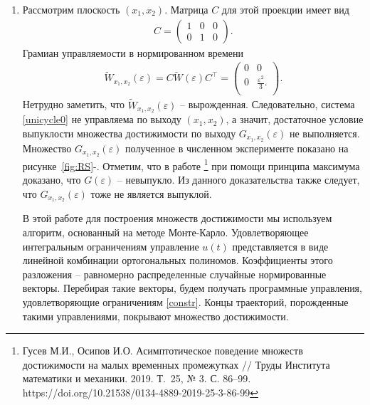 \documentclass[../main.tex]{subfiles}
\begin{document}
	\begin{enumerate}
		\item Рассмотрим плоскость $ (x_1, x_2) $. Матрица $ C $ для этой проекции имеет вид
		\begin{gather*}
			C = \begin{pmatrix}
				1 & 0 & 0 \\
				0 & 1 & 0
			\end{pmatrix}.
		\end{gather*}
		Грамиан управляемости в нормированном времени
		\begin{gather*}
			\widetilde{W}_{x_1,x_2}(\varepsilon) =  C \widetilde{W} (\varepsilon) C^{\top}  =\begin{pmatrix}
				0 & 0 \\
				0 & \frac{\varepsilon^2}{3}. \\
			\end{pmatrix}.
		\end{gather*}
		Нетрудно заметить, что $ \widetilde{W}_{x_1,x_2}(\varepsilon) $ -- вырожденная. Следовательно, система \eqref{unicycle0} не управляема по выходу $ (x_1, x_2) $, а значит, достаточное условие выпуклости множества достижимости по выходу $ G_{x_1,x_2}(\varepsilon) $ не выполняется. Множество $ G_{x_1,x_2}(\varepsilon) $ полученное в численном эксперименте показано на рисунке~\ref{fig:RS}-. Отметим, что в работе \footnote{Гусев М.И., Осипов И.О.
Асимптотическое поведение множеств достижимости на малых временных промежутках //
Труды Института математики и механики. 2019. Т.~25, № 3. С. 86--99.
https://doi.org/10.21538/0134-4889-2019-25-3-86-99} при помощи принципа максимума доказано, что $ G(\varepsilon) $ -- невыпукло. Из данного доказательства также следует, что $ G_{x_1,x_2}(\varepsilon) $ тоже не является выпуклой.
		
		В этой работе для построения множеств достижимости мы используем алгоритм, основанный на методе Монте-Карло. %
		Удовлетворяющее интегральным ограничениям управление $ u(t) $ представляется в виде линейной комбинации ортогональных полиномов. Коэффициенты этого разложения -- равномерно распределенные случайные нормированные векторы. Перебирая такие векторы, будем получать программные управления, удовлетворяющие ограничениям \eqref{constr}. Концы траекторий, порожденные такими управлениями, покрывают множество достижимости.
		

\end{enumerate}
\end{document}

